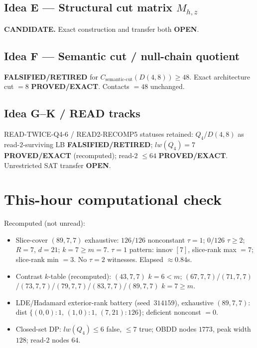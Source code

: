 \documentclass[11pt]{article}
\begin{document}
\subsection*{Idea E --- Structural cut matrix $M_{h,z}$}
\textbf{CANDIDATE.} Exact construction and transfer both \textbf{OPEN}.

\subsection*{Idea F --- Semantic cut / null-chain quotient}
\textbf{FALSIFIED/RETIRED} for $C_{\mathrm{semantic\textrm{-}cut}}(D(4,8))\ge48$.
Exact architecture cut $=8$ \textbf{PROVED/EXACT}. Contacts $=48$ unchanged.

\subsection*{Idea G--K / READ tracks}
READ-TWICE-Q4-6 / READ2-RECOMP5 statuses retained: $Q_4$/$D(4,8)$ as read-$2$-surviving LB
\textbf{FALSIFIED/RETIRED}; $lw(Q_4)=7$ \textbf{PROVED/EXACT} (recomputed); read-$2$ $\le64$
\textbf{PROVED/EXACT}. Unrestricted SAT transfer \textbf{OPEN}.

\section*{This-hour computational check}
Recomputed (not unread):
\begin{itemize}
\item Slice-cover $(89,7,7)$ exhaustive: $126/126$ nonconstant $\tau{=}1$;
  $0/126$ $\tau{\ge}2$; $R{=}7$, $d{=}21$; $k{=}7{\ge}m{=}7$.
  $\tau{=}1$ pattern: innov $[7]$, slice-rank max $=7$; slice-rank min $=3$.
  No $\tau{=}2$ witnesses. Elapsed $\approx0.84$s.
\item Contrast $k$-table (recomputed): $(43,7,7)$ $k{=}6{<}m$;
  $(67,7,7)$/$(71,7,7)$/$(73,7,7)$/$(79,7,7)$/$(83,7,7)$/$(89,7,7)$ $k{=}7{\ge}m$.
\item LDE/Hadamard exterior-rank battery (seed~$314159$), exhaustive $(89,7,7)$:
  dist $\{(0,0){:}1,\,(1,0){:}1,\,(7,21){:}126\}$; deficient nonconst $=0$.
\item Closed-set DP: $lw(Q_4)\le6$ false, $\le7$ true; OBDD nodes $1773$, peak width $128$;
  read-$2$ nodes $64$.
\end{itemize}
\end{document}
